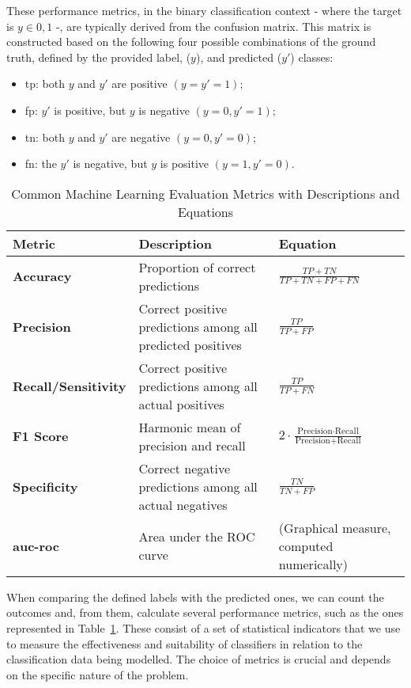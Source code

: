 These performance metrics, in the binary classification context - where the target is $y\in{0,1}$ -, are typically derived from the confusion matrix. This matrix is constructed based on the following four possible combinations of the ground truth, defined by the provided label, ($y$), and predicted ($y'$) classes:
\begin{itemize}
    \item \ac{tp}: both $y$ and $y'$ are positive $(y = y' = 1)$;
    \item \ac{fp}: $y'$ is positive, but $y$ is negative $(y=0, y' = 1)$;
    \item \ac{tn}: both $y$ and $y'$ are negative $(y=0, y'=0)$;
    \item  \ac{fn}: the $y'$ is negative, but $y$ is positive $(y=1,y'= 0)$.
\end{itemize}

\begin{table}[htbp]
\centering
\renewcommand{\arraystretch}{1.4}
\setlength{\tabcolsep}{6pt}
\caption{Common Machine Learning Evaluation Metrics with Descriptions and Equations}
\label{tab:ml_metrics}
\begin{tabular}{@{}>{\bfseries}m{3cm} m{6cm} m{6cm}@{}}
\toprule
Metric & Description & Equation \\
\midrule
Accuracy & Proportion of correct predictions &
$\displaystyle \frac{TP + TN}{TP + TN + FP + FN}$ \\
Precision & Correct positive predictions among all predicted positives &
$\displaystyle \frac{TP}{TP + FP}$ \\
Recall/Sensitivity & Correct positive predictions among all actual positives &
$\displaystyle \frac{TP}{TP + FN}$ \\
F1 Score & Harmonic mean of precision and recall &
$\displaystyle 2 \cdot \frac{\text{Precision} \cdot \text{Recall}}{\text{Precision} + \text{Recall}}$ \\
Specificity & Correct negative predictions among all actual negatives &
$\displaystyle \frac{TN}{TN + FP}$ \\
\acs{auc-roc} & Area under the ROC curve &
(Graphical measure, computed numerically) \\
\bottomrule
\end{tabular}
\end{table}

When comparing the defined labels with the predicted ones, we can count the outcomes and, from them, calculate several performance metrics, such as the ones represented in Table~\ref{tab:ml_metrics}.
These consist of a set of statistical indicators that we use to measure the effectiveness and suitability of classifiers in relation to the classification data being modelled.
The choice of metrics is crucial and depends on the specific nature of the problem.

